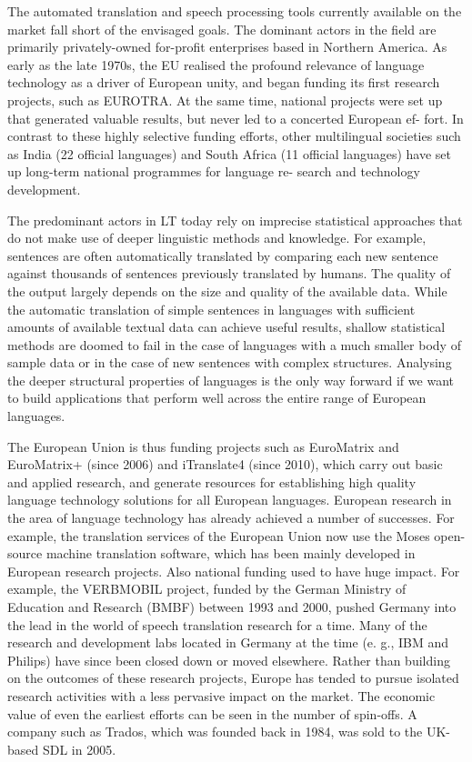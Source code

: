 \documentclass[10pt, plain]{../../metanetpaper}
\begin{document}
\begin{multicols}{2}
The automated translation and speech processing tools currently available on the market fall short of the envisaged goals. The dominant actors in the field are primarily privately-owned for-profit enterprises based in Northern America. As early as the late 1970s, the EU realised the profound relevance of language technology as a driver of European unity, and began funding its first research projects, such as EUROTRA. At the same time, national projects were set up that generated valuable results, but never led to a concerted European ef- fort. In contrast to these highly selective funding efforts, other multilingual societies such as India (22 official languages) and South Africa (11 official languages) have set up long-term national programmes for language re- search and technology development.

The predominant actors in LT today rely on imprecise statistical approaches that do not make use of deeper linguistic methods and knowledge. For example, sentences are often automatically translated by comparing each new sentence against thousands of sentences previously translated by humans. The quality of the output largely depends on the size and quality of the available data. While the automatic translation of simple sentences in languages with sufficient amounts of available textual data can achieve useful results, shallow statistical methods are doomed to fail in the case of languages with a much smaller body of sample data or in the case of new sentences with complex structures. Analysing the deeper structural properties of languages is the only way forward if we want to build applications that perform well across the entire range of European languages.

The European Union is thus funding projects such as EuroMatrix and EuroMatrix+ (since 2006) and iTranslate4 (since 2010), which carry out basic and applied research, and generate resources for establishing high quality language technology solutions for all European languages. European research in the area of language technology has already achieved a number of successes. For example, the translation services of the European Union now use the Moses open-source machine translation software, which has been mainly developed in European research projects. Also national funding used to have huge impact. For example, the VERBMOBIL project, funded by the German Ministry of Education and Research (BMBF) between 1993 and 2000, pushed Germany into the lead in the world of speech translation research for a time. Many of the research and development labs located in Germany at the time (e. g., IBM and Philips) have since been closed down or moved elsewhere. Rather than building on the outcomes of these research projects, Europe has tended to pursue isolated research activities with a less pervasive impact on the market. The economic value of even the earliest efforts can be seen in the number of spin-offs. A company such as Trados, which was founded back in 1984, was sold to the UK-based SDL in 2005.


\end{multicols}
\end{document}
